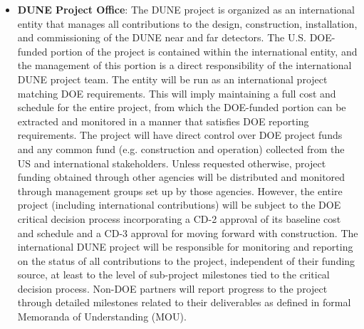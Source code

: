 \begin{itemize}
\item {\bf DUNE Project Office}: 
The DUNE project is organized as an international entity that manages all contributions to the design, construction, installation, and commissioning of the DUNE near and far detectors.  The U.S. DOE-funded portion of the project is contained within the international entity, and the management of this portion is a direct responsibility of the international DUNE project team.  The entity will be run as an international project matching DOE requirements. This will imply maintaining a full cost and schedule for the entire project, from which the DOE-funded portion can be extracted and monitored in a manner that satisfies DOE reporting requirements.  The project will have direct control over DOE project funds and any common fund (e.g. construction and operation) collected from the US and international stakeholders.  Unless requested otherwise, project funding obtained through other agencies will be distributed and monitored through management groups set up by those agencies.  However, the entire project (including international contributions) will be subject to the DOE critical decision process incorporating a CD-2 approval of its baseline cost and schedule and a CD-3 approval for moving forward with construction.  The international DUNE project will be responsible for monitoring and reporting on the status of all contributions to the project, independent of their funding source, at least to the level of sub-project milestones tied to the critical decision process.  Non-DOE partners will report progress to the project through detailed milestones related to their deliverables as defined in formal Memoranda of Understanding (MOU).     
\end{itemize}







